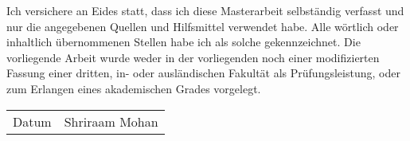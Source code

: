 \newcommand{\theauthor}{Shriraam Mohan}
\pagestyle{empty}

\setlength{\parindent}{0in}
Ich versichere an Eides statt, dass ich diese Masterarbeit selbst\"andig verfasst und nur die angegebenen Quellen und Hilfsmittel verwendet habe.
%
Alle w\"ortlich oder inhaltlich \"ubernommenen Stellen habe ich als solche gekennzeichnet.
%
Die vorliegende Arbeit wurde weder in der vorliegenden noch einer modifizierten Fassung einer dritten, in- oder ausl\"andischen Fakult\"at als Pr\"ufungsleistung, oder zum Erlangen eines akademischen Grades vorgelegt.

\vspace{1cm}

\begin{flushright}
	\begin{tabular}{p{2cm}p{6cm}}
		\hline
		Datum & \theauthor
		\smallskip
	\end{tabular}
\end{flushright}
